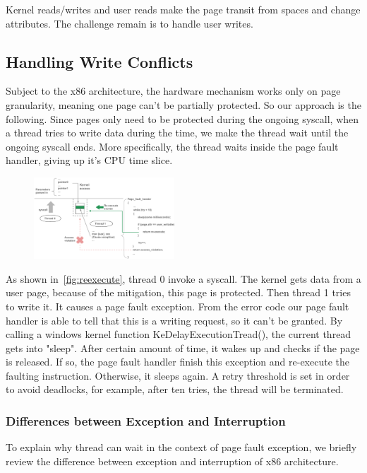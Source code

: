 Kernel reads/writes and user reads make the page transit from spaces and change attributes. The challenge remain is to handle user writes. 


\subsection{Handling Write Conflicts}
Subject to the x86 architecture, the hardware mechanism works only on page granularity, meaning one page can't be partially protected. So our approach is the following. Since pages only need to be protected during the ongoing syscall, when a thread tries to write data during the time, we make the thread wait until the ongoing syscall ends. More specifically, the thread waits inside the page fault handler, giving up it's CPU time slice. 

\begin{figure}[th]
  \includegraphics[width=0.47\textwidth]{figures/reexecute}
  \centering
  \caption{}
  \label{fig:reexecute}
\end{figure}


As shown in~\autoref{fig:reexecute}, thread 0 invoke a syscall. The kernel gets data from a user page, because of the mitigation, this page is protected. Then thread 1 tries to write it. It causes a page fault exception. From the error code our page fault handler is able to tell that this is a writing request, so it can't be granted. By calling a windows kernel function KeDelayExecutionTread(), the current thread gets into "sleep". After certain amount of time, it wakes up and checks if the page is released. If so, the page fault handler finish this exception and re-execute the faulting instruction. Otherwise, it sleeps again. A retry threshold is set in order to avoid deadlocks, for example, after ten tries, the thread will be terminated.  

\subsubsection{Differences between Exception and Interruption}

To explain why thread can wait in the context of page fault exception, we briefly review the difference between exception and interruption of x86 architecture.

